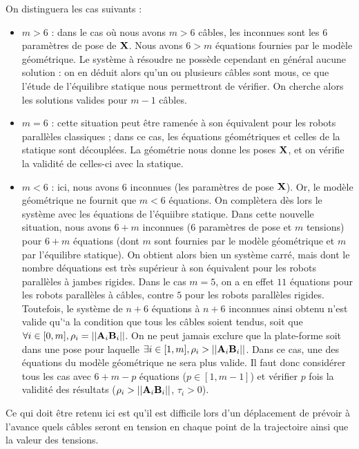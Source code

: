 On distinguera les cas suivants :
\begin{itemize}
  \item $m > 6$ : dans le cas o\`u nous avons $m > 6$ c\^ables, les inconnues 
sont les $6$ param\`etres de pose de $\bf X$. Nous avons $6 > m$ \'equations 
fournies par le mod\`ele g\'eom\'etrique. Le syst\`eme \`a r\'esoudre ne 
poss\`ede cependant en g\'en\'eral aucune solution : on en d\'eduit alors qu'un 
ou plusieurs c\^ables sont mous, ce que l'\'etude de l'\'equilibre statique 
nous permettront de v\'erifier. On cherche alors les solutions valides pour 
$m-1$ c\^ables.
  \item $m = 6$ : cette situation peut \^etre ramen\'ee \`a son 
\'equivalent pour les robots parall\`eles classiques ; dans ce cas, les 
\'equations g\'eom\'etriques et celles de la statique sont d\'ecoupl\'ees. La 
g\'eom\'etrie nous donne les poses $\bf X$, et on v\'erifie la validit\'e de 
celles-ci avec la statique.
  \item $m < 6$ : ici, nous avons $6$ inconnues (les param\`etres de pose $\bf 
X$). Or, le mod\`ele g\'eom\'etrique ne fournit que $m < 6$ \'equations. On 
compl\`etera d\`es lors le syst\`eme avec les \'equations de l'\'equiibre 
statique. Dans cette nouvelle situation, nous avons $6 + m$ inconnues ($6$ 
param\`etres de pose et $m$ tensions) pour $6 + m$ \'equations (dont $m$ sont 
fournies par le mod\`ele g\'eom\'etrique et $m$ par l'\'equilibre statique). On 
obtient alors bien un syst\`eme carr\'e, mais dont le nombre d\'equations est 
tr\`es sup\'erieur \`a son \'equivalent pour les robots parall\`eles \`a jambes 
rigides. Dans le cas $m = 5$, on a en effet $11$ \'equations pour les robots 
parall\`eles \`a c\^ables, contre $5$ pour les robots parall\`eles rigides.
Toutefois, le syst\`eme de $n+6$ \'equations \`a $n+6$ inconnues ainsi obtenu 
n'est valide qu'`a la condition que tous les c\^ables soient tendus, soit que 
$\forall i \in [0,m], \rho_i = ||{\bf A}_i{\bf B}_i||$. On ne peut jamais 
exclure que la plate-forme soit dans une pose pour la\-quelle $\exists i \in 
[1,m], \rho_i > ||{\bf A}_i{\bf B}_i||$. Dans ce cas, une des \'equations du 
mod\`ele g\'eom\'etrique ne sera plus valide. Il faut donc consid\'erer tous 
les cas avec $6+m-p$ \'equations ($p \in [1, m-1]$) et v\'erifier $p$ fois la 
validit\'e des r\'esultats ($\rho_i > ||{\bf A}_i{\bf B}_i||$, $\tau_i > 0$). 
\end{itemize}

Ce qui doit \^etre retenu ici est qu'il est difficile lors d'un déplacement de 
prévoir à l'avance quels câbles seront en tension en chaque point de la 
trajectoire ainsi que la valeur des tensions.

